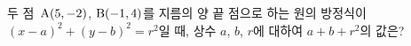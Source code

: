 두 점~$\mathrm{A}(5{,}\mkern3mu\mathopen{}-2)$, $\mathrm{B}(-1{,}\mkern3mu\mathopen{}4)$를 지름의 양 끝 점으로 하는 원의 방정식이 $(x-a)^2+(y-b)^2=r^2$일 때, 상수 $a$, $b$, $r$에 대하여 $a+b+r^2$의 값은?
